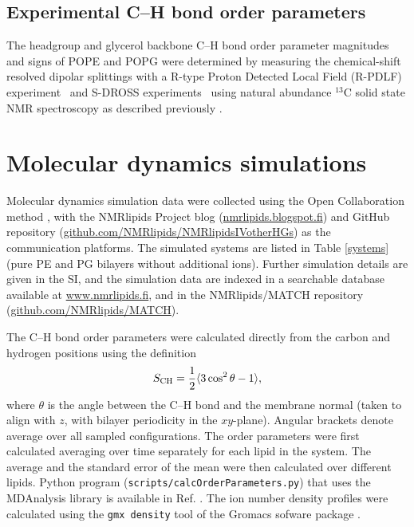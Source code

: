 \documentclass[aps,prl,superscriptaddress,twocolumn]{revtex4}
\begin{document}
\subsection{Experimental C--H bond order parameters}%

The headgroup and glycerol backbone C--H bond order parameter magnitudes and signs of POPE and POPG
were determined by measuring the chemical-shift resolved dipolar splittings
with a R-type Proton Detected Local Field (R-PDLF) experiment~\cite{dvinskikh04} and
S-DROSS experiments~\cite{gross97} using natural abundance $^{13}$C solid state NMR spectroscopy
as described previously \cite{ferreira13,ferreira16,NMRlipidsIVps}.

\section{Molecular dynamics simulations}

Molecular dynamics simulation data were collected using
the Open Collaboration method \cite{botan15}, with
the NMR\-lipids Project blog (\url{nmrlipids.blogspot.fi}) and
GitHub repository (\url{github.com/NMRlipids/NMRlipidsIVotherHGs})
as the communication platforms.
The simulated systems are listed in 
Table \ref{systems} (pure PE and PG bilayers without additional ions).
Further simulation details are given in the SI, and
the simulation data are indexed in a
searchable database available at \url{www.nmrlipids.fi},
and in the NMRlipids/MATCH repository (\url{github.com/NMRlipids/MATCH}).

The C--H bond order parameters were calculated directly
from the carbon and hydrogen positions using the definition
\begin{equation}
S_{\rm CH}=\frac{1}{2}\langle 3\cos^2\theta -1 \rangle,
\end{equation}
where $\theta$ is the angle between the C--H bond and the membrane normal
(taken to align with $z$, with bilayer periodicity in the $xy$-plane).
Angular brackets denote average over all sampled configurations.
The order parameters were first calculated averaging over time separately
for each lipid in the system. The average and
the standard error of the mean were then calculated over different lipids.
Python program ({\tt scripts/calcOrderParameters.py}) that uses the
MDAnalysis library \cite{agrawal11,gowers16} is available in Ref. . 
The ion number density profiles were calculated using the {\tt gmx density} tool
of the Gromacs sofware package \cite{gromacsMANUAL}.
\end{document}
